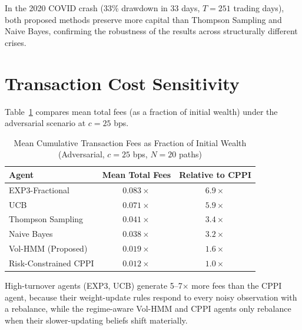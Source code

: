 In the 2020 COVID crash (33\% drawdown in 33 days, $T = 251$ trading days),
both proposed methods preserve more capital than Thompson Sampling and Naive
Bayes, confirming the robustness of the results across structurally different
crises.

\section{Transaction Cost Sensitivity}

Table~\ref{tab:fees} compares mean total fees (as a fraction of initial
wealth) under the adversarial scenario at $c = 25$ bps.

\begin{table}[h]
\centering
\caption{Mean Cumulative Transaction Fees as Fraction of Initial Wealth
         (Adversarial, $c = 25$ bps, $N = 20$ paths)}
\label{tab:fees}
\renewcommand{\arraystretch}{1.2}
\begin{tabular}{lcc}
\toprule
\textbf{Agent} & \textbf{Mean Total Fees} & \textbf{Relative to CPPI} \\
\midrule
EXP3-Fractional      & $0.083\times$ & $6.9\times$ \\
UCB                  & $0.071\times$ & $5.9\times$ \\
Thompson Sampling    & $0.041\times$ & $3.4\times$ \\
Naive Bayes          & $0.038\times$ & $3.2\times$ \\
Vol-HMM (Proposed)   & $0.019\times$ & $1.6\times$ \\
Risk-Constrained CPPI & $0.012\times$ & $1.0\times$ \\
\bottomrule
\end{tabular}
\end{table}

High-turnover agents (EXP3, UCB) generate 5--7$\times$ more fees than the
CPPI agent, because their weight-update rules respond to every noisy
observation with a rebalance, while the regime-aware Vol-HMM and CPPI
agents only rebalance when their slower-updating beliefs shift materially.
